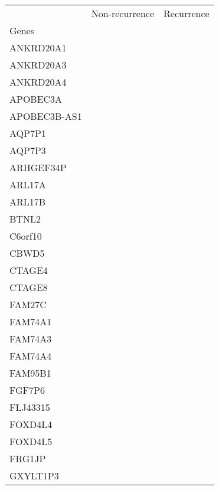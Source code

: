 \begin{tabular}{lcc}
\toprule
{} & Non-recurrence & Recurrence \\
Genes              &                &            \\
\midrule
ANKRD20A1          &                &            \\
ANKRD20A3          &                &            \\
ANKRD20A4          &                &            \\
APOBEC3A           &                &            \\
APOBEC3B-AS1       &                &            \\
AQP7P1             &                &            \\
AQP7P3             &                &            \\
ARHGEF34P          &                &            \\
ARL17A             &                &            \\
ARL17B             &                &            \\
BTNL2              &                &            \\
C6orf10            &                &            \\
CBWD5              &                &            \\
CTAGE4             &                &            \\
CTAGE8             &                &            \\
FAM27C             &                &            \\
FAM74A1            &                &            \\
FAM74A3            &                &            \\
FAM74A4            &                &            \\
FAM95B1            &                &            \\
FGF7P6             &                &            \\
FLJ43315           &                &            \\
FOXD4L4            &                &            \\
FOXD4L5            &                &            \\
FRG1JP             &                &            \\
GXYLT1P3           &                &            \\

\end{tabular}

